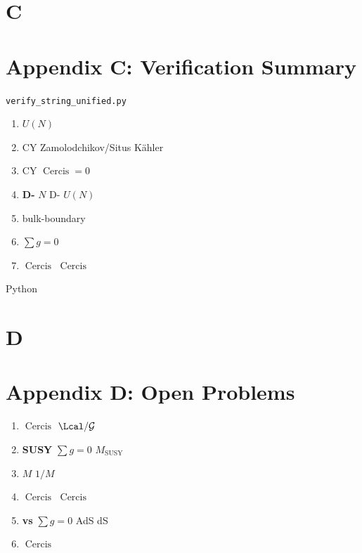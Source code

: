 \documentclass[12pt,a4paper]{article}
\theoremstyle{plain}
\theoremstyle{definition}
\newcommand{\Gauge}{\mathcal{G}}
\DeclareMathOperator{\Cercis}{Cercis}
\begin{document}
\section{C}
\section*{Appendix C: Verification Summary}

 \texttt{verify\_string\_unified.py} 


\begin{enumerate}[label=\textbf{ \arabic*:}]
    \item \textbf{}  $U(N)$ 
    
    \item \textbf{}  CY  Zamolodchikov/Situs 
     Kähler 
    \item \textbf{}  CY  $\Cercis = 0$
    \item \textbf{D-}  $N$  D- $U(N)$ 
    
    \item \textbf{}  bulk-boundary 
    \item \textbf{} 
     $\sum g = 0$ 
    \item \textbf{$\Cercis$ }  $\Cercis$ 
    
\end{enumerate}

 Python 

\section{D}
\section*{Appendix D: Open Problems}

\begin{enumerate}[label=\textbf{ \arabic*:}]
    \item \textbf{}  $\Cercis$ 
     $\Lcal / \Gauge$ 
    \item \textbf{SUSY }  $\sum g = 0$ 
     $M_{\text{SUSY}}$
    \item \textbf{ $M$ }  $1/M$ 
    \item \textbf{ $\Cercis$}  $\Cercis$ 
    \item \textbf{ vs } $\sum g = 0$ 
    AdS  dS 
    \item \textbf{} $\Cercis$ 
    
\end{enumerate}
\end{document}
